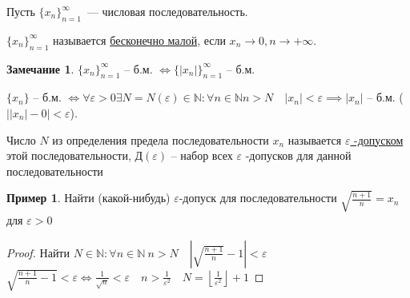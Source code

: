 \documentclass{book}
\newcommand\N{\ensuremath{\mathbb{N}}}
\theoremstyle{definition}
\newtheorem*{note}{Замечание}
\newtheorem*{example}{Пример}
\begin{document}
    \begin{definition}
        Пусть $\{x_n\}_{n=1}^{\infty }$~--- числовая последовательность. 

        $\{x_n\}_{n=1}^{\infty }$ называется \underline{бесконечно малой}, если $x_{n} \to 0, n\to +\infty$.
    \end{definition}
    
    \begin{note}
        $\{x_n\}_{n=1}^{\infty }$ -- б.м. $\iff \{\left| x_{n}  \right| \}_{n=1}^{\infty }$ -- б.м.

        $\{x_n\}$ -- б.м. $\iff  \forall \varepsilon>0 \exists N = N(\varepsilon)\in \N: \forall n\in \N  n>N\quad \left| x_n \right| <\varepsilon \implies \left| x_n \right|  $ -- б.м. ($\left| \left| x_{n}  \right| -0 \right| <\varepsilon$).
    \end{note}

    \begin{definition}
        Число $N$ из определения предела последовательности $x_{n} $ называется \underline{$\varepsilon$ -допуском} этой последовательности, Д$\left( \varepsilon \right) $ -- набор всех $\varepsilon$ -допусков для данной последовательности
    \end{definition}

    \begin{example}
        Найти (какой-нибудь) $\varepsilon$-допуск для последовательности $\sqrt{\frac{n+1}{n}} = x_{n}  $ для $\varepsilon>0$
    \end{example}
    \begin{proof}
        Найти $N\in \N :\forall n\in \N ~n>N\quad \left| \sqrt{\frac{n+1}{n}} -1 \right| <\varepsilon$\\ 
        $\sqrt{\frac{n+1}{n}-1} <\varepsilon \iff  \frac{1}{\sqrt{n} }<\varepsilon\quad n>\frac{1}{\varepsilon^2}\quad N = \left\lfloor \frac{1}{\varepsilon^2} \right\rfloor +1$
    \end{proof}
\end{document}
